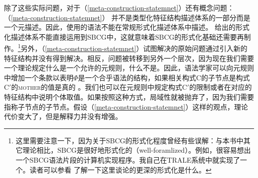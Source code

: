除了这些实际问题，对于（\ref{meta-construction-statemnet}）还有概念问题：（\ref{meta-construction-statemnet}） 并不是类型化特征结构描述体系的一部分而是一个元描述。因此，使用\label{page-sbcg-formalization}的语法不能在常规形式化描述体系中描述。 \citet{Richter2004a-u}给出的形式化描述体系不能直接运用到SBCG中，这就意味着SBCG的形式化基础还需要再制作。\footnote{%
 这里需要注意一下，因为关于SBCG的形式化程度曾经有些误解：与本书中其它理论相比，SBCG是很好地形式化的（well-foramlized）。例如，很容易想出一个SBCG语法片段的计算机实现程序。我自己在TRALE系统中就实现了一个。读者可以参看 \citet{Richter2004a-u}了解一下这里谈论的更深的形式化是什么。
}另外，（\ref{meta-construction-statemnet}）试图解决的原始问题通过引入新的特征结构并没有得到解决。相反，问题被转移到另外一个层次，因为现在我们需要一个理论规定什么是一个允许的元规则，什么不是。因此，语法学家可以向元规则中增加一个条款以表明$\Phi$是一个合乎语法的结构，如果相关构式C的子节点是构式C$'$的\textsc{mother}的值是真的 。我们也可以在元规则中规定构式C$'$的限制或者在对应的特征结构中说明个体取值。如果按照这种方式，局域性就被抛弃了，因为我们需要指称子节点的子节点。假设（\ref{meta-construction-statemnet}）这样的观点，理论代价变大了，但是解释力并没有增强。
